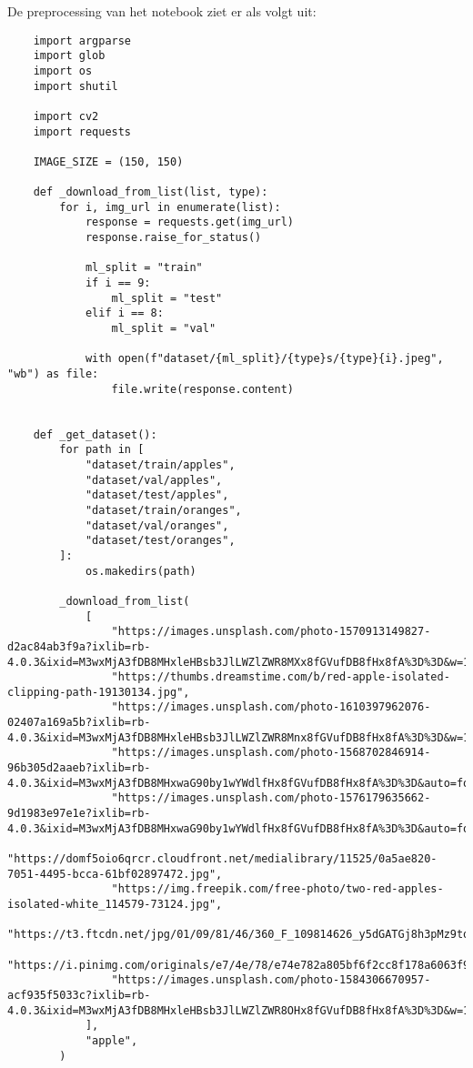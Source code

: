 De preprocessing van het notebook ziet er als volgt uit: 
\begin{verbatim}
    import argparse
    import glob
    import os
    import shutil

    import cv2
    import requests

    IMAGE_SIZE = (150, 150)

    def _download_from_list(list, type):
        for i, img_url in enumerate(list):
            response = requests.get(img_url)
            response.raise_for_status()

            ml_split = "train"
            if i == 9:
                ml_split = "test"
            elif i == 8:
                ml_split = "val"

            with open(f"dataset/{ml_split}/{type}s/{type}{i}.jpeg", "wb") as file:
                file.write(response.content)


    def _get_dataset():
        for path in [
            "dataset/train/apples",
            "dataset/val/apples",
            "dataset/test/apples",
            "dataset/train/oranges",
            "dataset/val/oranges",
            "dataset/test/oranges",
        ]:
            os.makedirs(path)

        _download_from_list(
            [
                "https://images.unsplash.com/photo-1570913149827-d2ac84ab3f9a?ixlib=rb-4.0.3&ixid=M3wxMjA3fDB8MHxleHBsb3JlLWZlZWR8MXx8fGVufDB8fHx8fA%3D%3D&w=1000&q=80",
                "https://thumbs.dreamstime.com/b/red-apple-isolated-clipping-path-19130134.jpg",
                "https://images.unsplash.com/photo-1610397962076-02407a169a5b?ixlib=rb-4.0.3&ixid=M3wxMjA3fDB8MHxleHBsb3JlLWZlZWR8Mnx8fGVufDB8fHx8fA%3D%3D&w=1000&q=80",
                "https://images.unsplash.com/photo-1568702846914-96b305d2aaeb?ixlib=rb-4.0.3&ixid=M3wxMjA3fDB8MHxwaG90by1wYWdlfHx8fGVufDB8fHx8fA%3D%3D&auto=format&fit=crop&w=2940&q=80",
                "https://images.unsplash.com/photo-1576179635662-9d1983e97e1e?ixlib=rb-4.0.3&ixid=M3wxMjA3fDB8MHxwaG90by1wYWdlfHx8fGVufDB8fHx8fA%3D%3D&auto=format&fit=crop&w=2787&q=80",
                "https://domf5oio6qrcr.cloudfront.net/medialibrary/11525/0a5ae820-7051-4495-bcca-61bf02897472.jpg",
                "https://img.freepik.com/free-photo/two-red-apples-isolated-white_114579-73124.jpg",
                "https://t3.ftcdn.net/jpg/01/09/81/46/360_F_109814626_y5dGATGj8h3pMz9tq1HNRfiuXR12uFCj.jpg",
                "https://i.pinimg.com/originals/e7/4e/78/e74e782a805bf6f2cc8f178a6063f9d7.jpg",
                "https://images.unsplash.com/photo-1584306670957-acf935f5033c?ixlib=rb-4.0.3&ixid=M3wxMjA3fDB8MHxleHBsb3JlLWZlZWR8OHx8fGVufDB8fHx8fA%3D%3D&w=1000&q=80",
            ],
            "apple",
        )


\end{verbatim}
